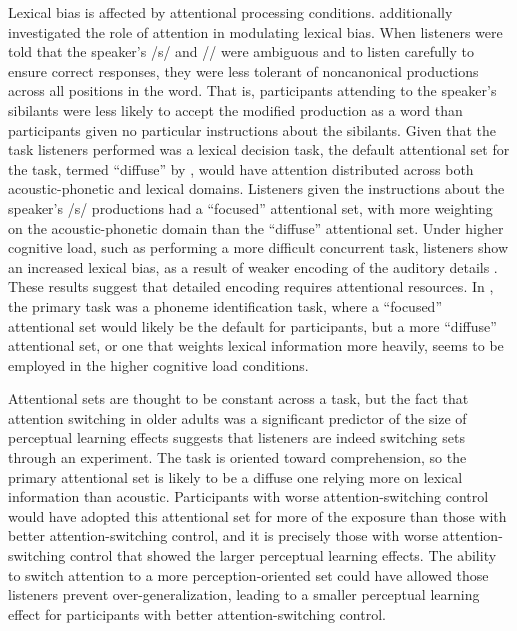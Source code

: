 Lexical bias is affected by attentional processing conditions.
\citet{Pitt2012} additionally investigated the role of attention in modulating lexical bias.  
When listeners were told that the speaker's /s/ and /\textesh/ were ambiguous and to listen carefully to ensure correct responses, they were less tolerant of noncanonical productions across all positions in the word.  
That is, participants attending to the speaker's sibilants were less likely to accept the modified production as a word than participants given no particular instructions about the sibilants.
Given that the task listeners performed was a lexical decision task, the default attentional set for the task, termed ``diffuse'' by \citet{Pitt2012}, would have attention distributed across both acoustic-phonetic and lexical domains.  Listeners given the instructions about the speaker's /s/ productions had a ``focused'' attentional set, with more weighting on the acoustic-phonetic domain than the ``diffuse'' attentional set.
Under higher cognitive load, such as performing a more difficult concurrent task, listeners show an increased lexical bias, as a result of weaker encoding of the auditory details \citep{Mattys2011}.  These results suggest that detailed encoding requires attentional resources.  In \citet{Mattys2011}, the primary task was a phoneme identification task, where a ``focused'' attentional set would likely be the default for participants, but a more ``diffuse'' attentional set, or one that weights lexical information more heavily, seems to be employed in the higher cognitive load conditions.

Attentional sets are thought to be constant across a task, but the fact that attention switching in older adults was a significant predictor of the size of perceptual learning effects \citep{Scharenborg2014} suggests that listeners are indeed switching sets through an experiment.
The task is oriented toward comprehension, so the primary attentional set is likely to be a diffuse one relying more on lexical information than acoustic.
Participants with worse attention-switching control would have adopted this attentional set for more of the exposure than those with better attention-switching control, and it is precisely those with worse attention-switching control that showed the larger perceptual learning effects.
The ability to switch attention to a more perception-oriented set could have allowed those listeners prevent over-generalization, leading to a smaller perceptual learning effect for participants with better attention-switching control. 

